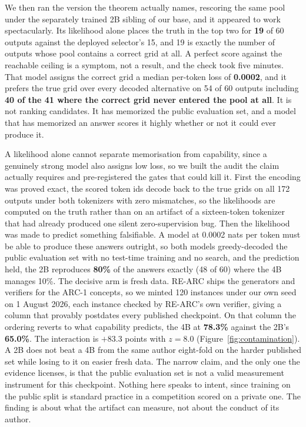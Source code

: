 \documentclass[11pt]{article}
\begin{document}
We then ran the version the theorem actually names, rescoring the same pool under the separately
trained 2B sibling of our base, and it appeared to work spectacularly. Its likelihood alone places the
truth in the top two for \textbf{19} of 60 outputs against the deployed selector's 15, and 19 is exactly
the number of outputs whose pool contains a correct grid at all. A perfect score against the reachable
ceiling is a symptom, not a result, and the check took five minutes. That model assigns the
correct grid a median per-token loss of \textbf{0.0002}, and it prefers the true grid over every decoded
alternative on 54 of 60 outputs including \textbf{40 of the 41 where the correct grid never entered the
pool at all}. It is not ranking candidates. It has memorized the public evaluation set, and a model that
has memorized an answer scores it highly whether or not it could ever produce it.

A likelihood alone cannot separate memorisation from capability, since a genuinely strong model also
assigns low loss, so we built the audit the claim actually requires and pre-registered the gates that
could kill it. First the encoding was proved exact, the scored token ids decode back to the true grids
on all 172 outputs under both tokenizers with zero mismatches, so the likelihoods are computed on the
truth rather than on an artifact of a sixteen-token tokenizer that had already produced one silent
zero-supervision bug. Then the likelihood was made to predict something falsifiable. A model at 0.0002
nats per token must be able to produce these answers outright, so both models greedy-decoded the public
evaluation set with no test-time training and no search, and the prediction held, the 2B reproduces
\textbf{80\%} of the answers exactly (48 of 60) where the 4B manages 10\%. The decisive arm is fresh
data. RE-ARC ships the generators and verifiers for the ARC-1 concepts, so we minted 120 instances
under our own seed on 1 August 2026, each instance checked by RE-ARC's own verifier, giving a column
that provably postdates every published checkpoint. On that column the ordering reverts to what
capability predicts, the 4B at \textbf{78.3\%} against the 2B's \textbf{65.0\%}. The interaction is
$+83.3$ points with $z = 8.0$ (Figure~\ref{fig:contamination}). A 2B does not beat a 4B from the same
author eight-fold on the harder published set while losing to it on easier fresh data. The narrow claim,
and the only one the evidence licenses, is that the public evaluation set is not a valid measurement
instrument for this checkpoint. Nothing here speaks to intent, since training on the public split is standard
practice in a competition scored on a private one. The finding is about what the artifact can measure,
not about the conduct of its author.
\end{document}
